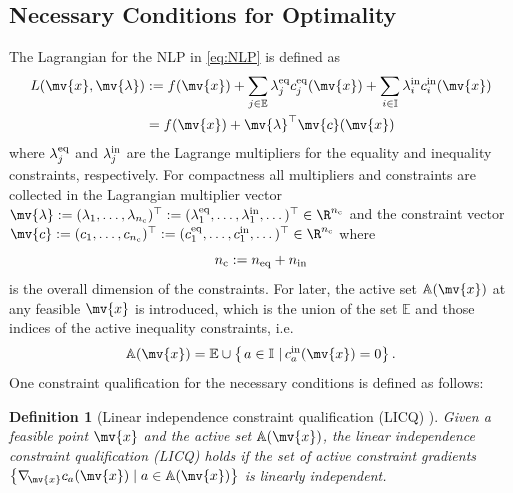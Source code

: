 \documentclass[journal]{IEEEtranTIE}
\newtheorem{definition}{Definition}
\begin{document}
\subsection{Necessary Conditions for Optimality}\label{subsec:Ne_Cond}
The Lagrangian for the NLP in \eqref{eq:NLP} is defined as 
%
\begin{align}\label{eq:Standard Lagrangian}
L(\mv{x},\mv{\lambda}) & := f(\mv{x}) + \sum\limits_{j \in \mathbb{E}} \lambda^{\rm eq}_j c^{\rm eq}_j(\mv{x}) + \sum\limits_{i \in \mathbb{I}} \lambda^{\rm in}_i c^{\rm in}_i(\mv{x}) \notag \\
 & = f(\mv{x}) + \mv{\lambda}^\top \mv{c}(\mv{x}) 
\end{align}
%
where $\lambda_j^{\rm eq}$  and $\lambda_j^{\rm in}$ are the Lagrange multipliers for the equality and inequality constraints, respectively. For compactness all multipliers and constraints are collected in the Lagrangian multiplier vector $\mv{\lambda} := (\lambda_1, \dots, \lambda_{n_{\rm c}})^\top:= (\lambda_1^{\rm eq}, \dots, \lambda_1^{\rm in},\dots)^\top \in \R^{n_{\rm c}}$ and the constraint vector $\mv{c} := (c_1, \dots, c_{n_{\rm c}})^\top := (c_1^{\rm eq}, \dots, c_1^{\rm in},\dots)^\top \in \R^{n_{\rm c}}$ where
%
$$
    n_{\rm c} := n_{\rm eq}+n_{\rm in}
$$ 
%
is the overall dimension of the constraints. For later, the active set $\mathbb{A}(\mv{x})$ at any feasible $\mv{x}$ is introduced, which is the union of the set $\mathbb{E}$ and those indices of the active inequality constraints, i.e.
%
\begin{align}
\mathbb{A}(\mv{x}) = \mathbb{E} \cup \left\{ {\left. {a \in \mathbb{I}}\ \right| c^{\rm in}_a}(\mv{x}) = 0 \right\}.
\end{align}
%
One constraint qualification for the necessary conditions is defined as follows:
\begin{definition}[Linear independence constraint qualification (LICQ) \cite{jorge2006numerical}] 
Given a feasible point $\mv{x}$ and the active set $\mathbb{A}(\mv{x})$, the linear independence constraint qualification (LICQ) holds if the set of active constraint gradients $\left\{ {\nabla_{\!\mv{x}} c_a(\mv{x}) \; | \; a \in \mathbb{A}(\mv{x})} \right\}$ is linearly independent.
\end{definition}
\end{document}
